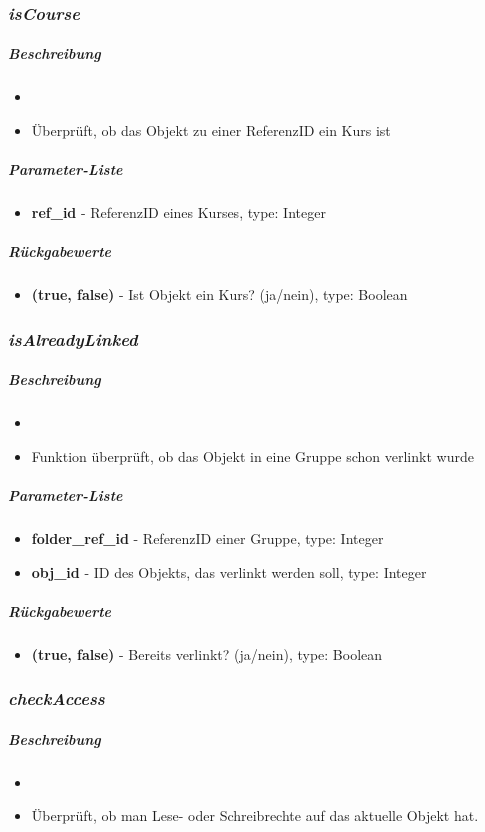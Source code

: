 \subsubsection*{\textit{isCourse}}\label{isCourseLGUI}
\subparagraph{Beschreibung}
\begin{itemize}
	\item[] \noindent{} 
	\item[] Überprüft, ob das Objekt zu einer ReferenzID ein Kurs ist
\end{itemize}
\subparagraph{Parameter-Liste}
\begin{itemize}
	\item[] \textbf{ref\_id} - ReferenzID eines Kurses, type: Integer
\end{itemize}
\subparagraph{Rückgabewerte}
\begin{itemize}
	\item[] \textbf{(true, false)} - Ist Objekt ein Kurs? (ja/nein), type: Boolean
\end{itemize}

\subsubsection*{\textit{isAlreadyLinked}}\label{isAlreadyLinkedLGUI}
\subparagraph{Beschreibung}
\begin{itemize}
	\item[] \noindent{} 
	\item[] Funktion überprüft, ob das Objekt in eine Gruppe schon verlinkt wurde
\end{itemize}
\subparagraph{Parameter-Liste}
\begin{itemize}
	\item[] \textbf{folder\_ref\_id} - ReferenzID einer Gruppe, type: Integer
	\item[] \textbf{obj\_id} - ID des Objekts, das verlinkt werden soll, type: Integer
\end{itemize}
\subparagraph{Rückgabewerte}
\begin{itemize}
	\item[] \textbf{(true, false)} - Bereits verlinkt? (ja/nein), type: Boolean
\end{itemize}

\subsubsection*{\textit{checkAccess}}\label{checkAccessLGUI}
\subparagraph{Beschreibung}
\begin{itemize}
	\item[] \noindent{} 
	\item[] Überprüft, ob man Lese- oder Schreibrechte auf das aktuelle Objekt hat.
\end{itemize}